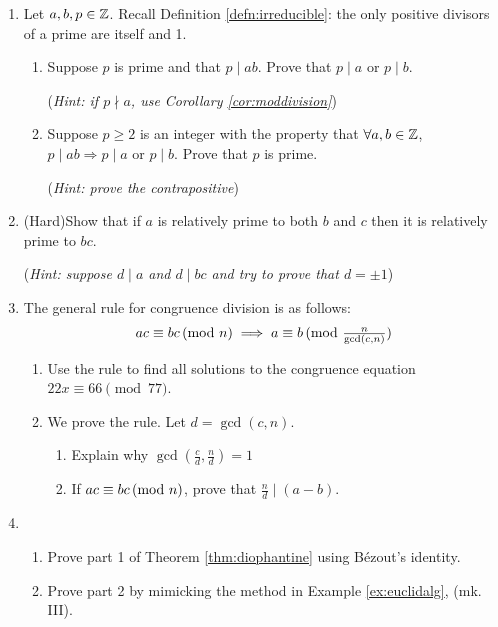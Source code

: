 \begin{exercises}{}{}
\begin{enumerate}
	  
		\item Let $a,b,p\in\mathbb{Z}$. Recall Definition \ref{defn:irreducible}: the only positive divisors of a prime are itself and 1.
	  \begin{enumerate}
	    \item Suppose $p$ is prime and that $p\mid ab$. Prove that $p\mid a$ or $p\mid b$.\par
	    (\emph{Hint: if $p\nmid a$, use Corollary \ref{cor:moddivision}})
	    \item Suppose $p\ge 2$ is an integer with the property that $\forall a,b\in\mathbb{Z}$, $p\mid ab\Longrightarrow p\mid a$ or $p\mid b$. Prove that $p$ is prime.\par
	    (\emph{Hint: prove the contrapositive})
	  \end{enumerate}
	    
	    
	    \item (Hard)\lstsp Show that if $a$ is relatively prime to both $b$ and $c$ then it is relatively prime to $bc$.\par
	    (\emph{Hint: suppose $d\mid a$ and $d\mid bc$ and try to prove that $d=\pm 1$})
	    
	    
			\item\label{exs:congdivision} The general rule for congruence division is as follows:
			\[
				ac\equiv bc\negthickspace\pmod{n} \implies a\equiv b\negthickspace\pmod{\tfrac n{\gcd(c,n)}}
			\]
			\begin{enumerate}
			  \item Use the rule to find all solutions to the congruence equation $22x\equiv 66\pmod{77}$.
			  \item We prove the rule. Let $d=\gcd(c,n)$.
			  \begin{enumerate}
			    \item Explain why $\gcd(\frac cd,\frac nd)=1$
			  	\item If $ac\equiv bc\negthickspace\pmod{n}$, prove that $\frac nd\mid(a-b)$.
				\end{enumerate}
			\end{enumerate}
			
	    
	  \item\begin{enumerate}
	    \item Prove part 1 of Theorem \ref{thm:diophantine} using Bézout's identity.
	    \item Prove part 2 by mimicking the method in Example \ref{ex:euclidalg}, (mk.\,III).
	  \end{enumerate} 
	    

\end{enumerate}
\end{exercises}
